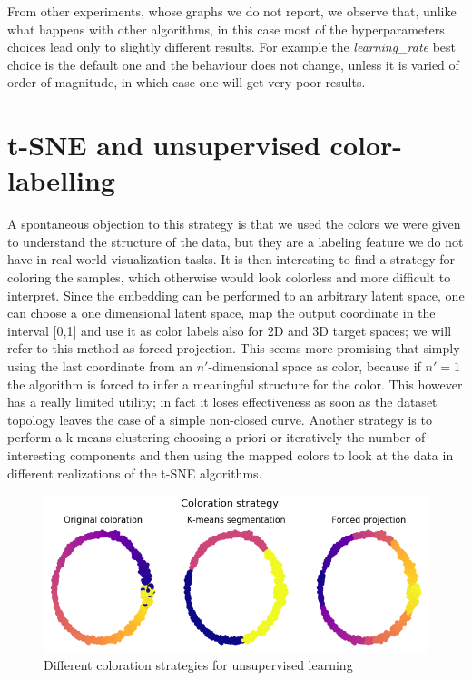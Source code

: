 \documentclass[%
 aip,
 jmp,%
 amsmath,amssymb,
 reprint,%
]{revtex4-1}
\begin{document}
From other experiments, whose graphs we do not report, we observe that,
unlike what happens with other algorithms, in this case most of the
hyperparameters choices lead only to slightly different results.
For example the \textit{learning\_rate} best choice is the default one
and the behaviour does not change, unless it is varied of order of magnitude,
in which case one will get very poor results.

\section{t-SNE and unsupervised color-labelling}
A spontaneous objection to this strategy is that we used the colors we were given to
understand the structure of the data, but they are a labeling feature we
do not have in real world visualization tasks. It is then interesting
to find a strategy for coloring the samples, which otherwise would look colorless
and more difficult to interpret.
Since the embedding can be performed to an arbitrary latent space, one can
choose a one dimensional latent space, map the output coordinate in the
interval [0,1] and use it  as color labels also for 2D and 3D target spaces;
we will refer to this method as forced projection.
This seems more promising that simply using the last coordinate from
an $n'$-dimensional space as color, because if $n'=1$ the algorithm is forced to infer a meaningful
structure for the color. This however has a really limited utility; in
fact it loses effectiveness as soon as the dataset topology leaves the
case of a simple non-closed curve. Another strategy is to
perform a k-means clustering choosing a priori or iteratively the number of
interesting components and then using the mapped colors to look at the data
in different realizations of the t-SNE algorithms.


\begin{figure}[h]
 \includegraphics[scale=0.26]{images/coloration.png}
 \caption{Different coloration strategies for unsupervised learning}
 \label{fig:coloring}
\end{figure}
\end{document}
